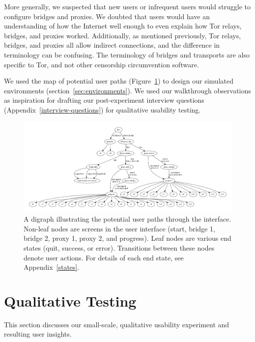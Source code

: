 \documentclass[USenglish,oneside,twocolumn]{article}
\begin{document}
More generally, we suspected that new users or infrequent users would struggle to configure bridges and proxies. We doubted that users would have an understanding of how the Internet well enough to even explain how Tor relays, bridges, and proxies worked. Additionally, as mentioned previously, Tor relays, bridges, and proxies all allow indirect connections, and the difference in terminology can be confusing. The terminology of bridges and transports are also specific to Tor, and not other censorship circumvention software. 

We used the map of potential user paths (Figure~\ref{fig:digraph}) to design our simulated environments (section~\ref{sec:environments}).  We used our walkthrough observations as inspiration for drafting our post-experiment interview questions (Appendix~\ref{interview-questions}) for qualitative usability testing. 

\begin{figure}
\centering
\includegraphics[width=\textwidth]{torconfig.pdf}
\caption{
A digraph illustrating the potential user paths through the interface. Non-leaf nodes are screens in the user interface (start, bridge 1, bridge 2, proxy 1, proxy 2, and progress). Leaf nodes are various end states (quit, success, or error). Transitions between these nodes denote user actions. For details of each end state, see Appendix~\ref{states}. 
}
\label{fig:digraph}
\end{figure} 

\section{Qualitative Testing}
\label{sec:qualitative}
This section discusses our small-scale, qualitative usability experiment and resulting user insights. 
\end{document}
